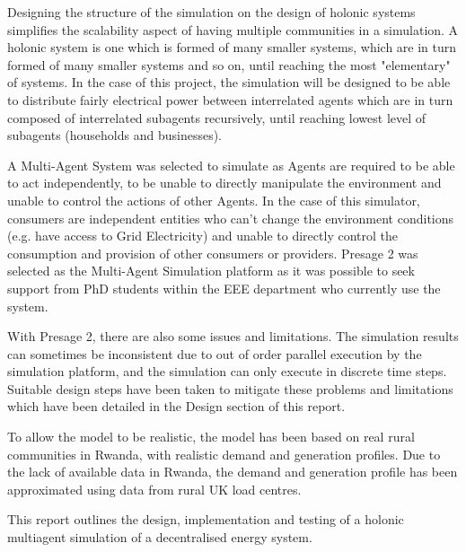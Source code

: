 Designing the structure of the simulation on the design of holonic systems simplifies the scalability aspect of having multiple communities in a simulation. A holonic system is one which is formed of many smaller systems, which are in turn formed of many smaller systems and so on, until reaching the most "elementary" of systems. In the case of this project, the simulation will be designed to be able to distribute fairly electrical power between interrelated agents which are in turn composed of interrelated subagents recursively, until reaching lowest level of subagents (households and businesses). 

A Multi-Agent System was selected to simulate as Agents are required to be able to act independently, to be unable to directly manipulate the environment and unable to control the actions of other Agents. In the case of this simulator, consumers are independent entities who can't change the environment conditions (e.g. have access to Grid Electricity) and unable to directly control the consumption and provision of other consumers or providers. Presage 2 was selected as the Multi-Agent Simulation platform as it was possible to seek support from PhD students within the EEE department who currently use the system.

With Presage 2, there are also some issues and limitations. The simulation results can sometimes be inconsistent due to out of order parallel execution by the simulation platform, and the simulation can only execute in discrete time steps. Suitable design steps have been taken to mitigate these problems and limitations which have been detailed in the Design section of this report. 

To allow the model to be realistic, the model has been based on real rural communities in Rwanda, with realistic demand and generation profiles. Due to the lack of available data in Rwanda, the demand and generation profile has been approximated using data from rural UK load centres.

This report outlines the design, implementation and testing of a holonic multiagent simulation of a decentralised energy system. 
